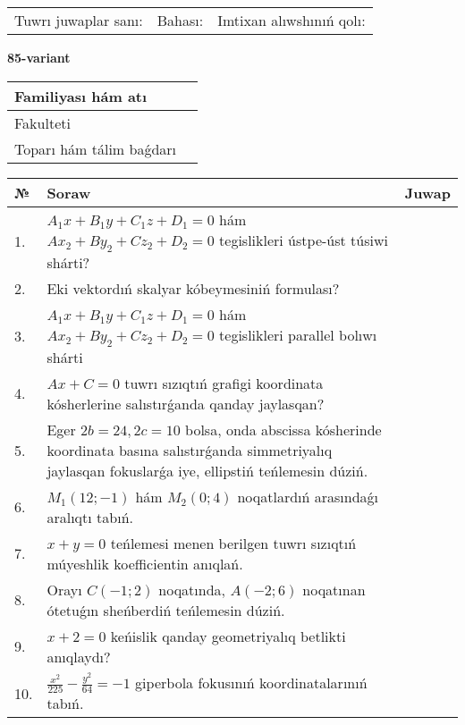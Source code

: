\documentclass{article}
\begin{document}
\vspace{1cm}

\begin{tabular}{lll}
Tuwrı juwaplar sanı: \underline{\hspace{1.5cm}} & 
Bahası: \underline{\hspace{1.5cm}} & 
Imtixan alıwshınıń qolı: \underline{\hspace{2cm}} \\
\end{tabular}

\egroup

\newpage


\textbf{85-variant}\\

\bgroup
\def\arraystretch{1.6} %

\begin{tabular}{|m{5.7cm}|m{9.5cm}|}
\hline
Familiyası hám atı & \\
\hline
Fakulteti  & \\
\hline
Toparı hám tálim baǵdarı  & \\
\hline
\end{tabular}

\vspace{1cm}

\begin{tabular}{|m{0.7cm}|m{10cm}|m{4cm}|}
\hline
№ & Soraw & Juwap \\
\hline
1. & $A_1x+B_1y+C_1z+D_1=0$ hám $Ax_2+By_2+Cz_2+D_2=0$ tegislikleri ústpe-úst túsiwi shárti? &  \\
\hline
2. & Eki vektordıń skalyar kóbeymesiniń formulası? &  \\
\hline
3. & $A_1x+B_1y+C_1z+D_1=0$ hám $Ax_2+By_2+Cz_2+D_2=0$ tegislikleri parallel bolıwı shárti &  \\
\hline
4. & $Ax+C=0$ tuwrı sızıqtıń grafigi koordinata kósherlerine salıstırǵanda qanday jaylasqan? &  \\
\hline
5. & Eger $2b=24, 2 c=10$ bolsa, onda abscissa kósherinde koordinata basına salıstırǵanda simmetriyalıq jaylasqan fokuslarǵa iye, ellipstiń teńlemesin dúziń. &  \\
\hline
6. & $M_{1} (12;-1)$ hám $M_{2} (0;4)$ noqatlardıń arasındaǵı aralıqtı tabıń. &  \\
\hline
7. & $x+y=0$ teńlemesi menen berilgen tuwrı sızıqtıń múyeshlik koefficientin anıqlań. &  \\
\hline
8. & Orayı $C (-1;2)$ noqatında, $A (-2;6 )$ noqatınan ótetuǵın sheńberdiń teńlemesin dúziń. &  \\
\hline
9. & $x+2=0$ keńislik qanday geometriyalıq betlikti anıqlaydı? &  \\
\hline
10. & $\frac{x^{2}}{225}-\frac{y^{2}}{64}=-1$ giperbola fokusınıń koordinatalarınıń tabıń. &  \\
\hline
\end{tabular}
\end{document}
